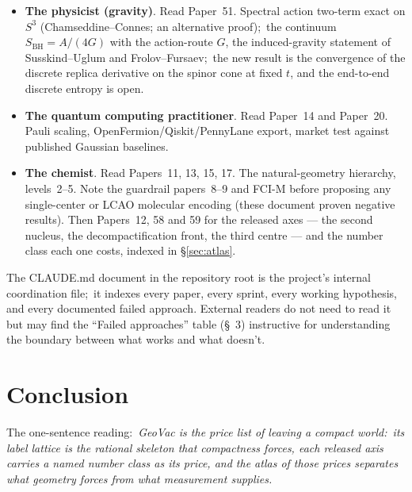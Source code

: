 \documentclass[11pt,a4paper]{article}
\newcommand{\sthree}{S^{3}}
\begin{document}
\begin{itemize}
    Papers~30, 28, and 36.  Paper~30 is Wilson lattice gauge theory on
    the label graphs ($SU(2)$ and compact $U(1)$ on the scalar graph,
    compact $U(1)$ on the Dirac Rule-B graph);\ Paper~28 determines the
    periods of Dirac spectral sums on $\sthree$;\ Paper~36 assembles the hydrogen Lamb shift at
    leading one-loop order ($-0.534\%$; textbook arithmetic, its GeoVac
    content the Bethe logarithms).
  \item \textbf{The physicist (gravity)}.  Read Paper~51.  Spectral
    action two-term exact on $\sthree$ (Chamseddine--Connes; an
    alternative proof);\ the continuum $S_{\mathrm{BH}} = A/(4G)$ with the
    action-route $G$, the induced-gravity statement of Susskind--Uglum and
    Frolov--Fursaev;\ the new result is the convergence of the discrete
    replica derivative on the spinor cone at fixed $t$, and the
    end-to-end discrete entropy is open.
  \item \textbf{The quantum computing practitioner}.  Read Paper~14
    and Paper~20.  Pauli scaling, OpenFermion/Qiskit/PennyLane
    export, market test against published Gaussian baselines.
  \item \textbf{The chemist}.  Read Papers~11, 13, 15, 17.  The
    natural-geometry hierarchy, levels~2--5.  Note the guardrail
    papers~8--9 and FCI-M before proposing any single-center or
    LCAO molecular encoding (these document proven negative
    results).  Then Papers~12, 58 and 59 for the released axes --- the
    second nucleus, the decompactification front, the third centre ---
    and the number class each one costs, indexed in \S\ref{sec:atlas}.
\end{itemize}

The CLAUDE.md document in the repository root is the project's
internal coordination file;\ it indexes every paper, every sprint,
every working hypothesis, and every documented failed approach.
External readers do not need to read it but may find the
``Failed approaches'' table (\S~3) instructive for understanding the
boundary between what works and what doesn't.

\section{Conclusion}
\label{sec:conclusion}

The one-sentence reading:\ \emph{GeoVac is the price list of leaving a
compact world:\ its label lattice is the rational skeleton that
compactness forces, each released axis carries a named number class as
its price, and the atlas of those prices separates what geometry forces
from what measurement supplies.}
\end{document}
